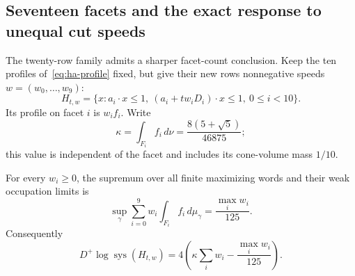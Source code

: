 \subsection{Seventeen facets and the exact response to unequal cut speeds}
\label{subsec:hko-seventeen}

The twenty-row family admits a sharper facet-count conclusion. Keep the ten
profiles of~\eqref{eq:ha-profile} fixed, but give their new rows nonnegative
speeds $w=(w_0,\ldots,w_9)$:
\[
 H_{t,w}=\{x:a_i\cdot x\leq1,\
                 (a_i+tw_iD_i)\cdot x\leq1,\ 0\leq i<10\}.
\]
Its profile on facet $i$ is $w_if_i$. Write
\[
 \kappa=\int_{F_i}f_i\,d\nu
        =\frac{8(5+\sqrt5)}{46875};
\]
this value is independent of the facet and includes its cone-volume mass
$1/10$.

\begin{proposition}\label{prop:ha-weighted}
For every $w_i\geq0$, the supremum over all finite maximizing words and their
weak occupation limits is
\begin{equation}\label{eq:ha-weighted-response}
 \sup_\gamma\sum_{i=0}^9w_i\int_{F_i}f_i\,d\mu_\gamma
       =\frac{\max_iw_i}{125}.
\end{equation}
Consequently
\begin{equation}\label{eq:ha-weighted-derivative}
 D^+\log\operatorname{sys}(H_{t,w})
       =4\left(\kappa\sum_iw_i-\frac{\max_iw_i}{125}\right).
\end{equation}
\end{proposition}

